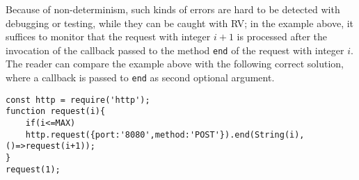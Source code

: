 Because of non-determinism, such kinds of errors are hard to be detected with debugging or testing, while they can be
caught with RV; in the example above, it suffices to monitor that the request with integer $i+1$ is processed
after the invocation of the callback passed to the method \lstinline{end} of the request with integer $i$.
The reader can compare the example above with the following correct solution, where a callback is passed to \lstinline{end}
as second optional argument.
\begin{lstlisting}
const http = require('http');
function request(i){
    if(i<=MAX)
	http.request({port:'8080',method:'POST'}).end(String(i),()=>request(i+1));
}
request(1);
\end{lstlisting}




